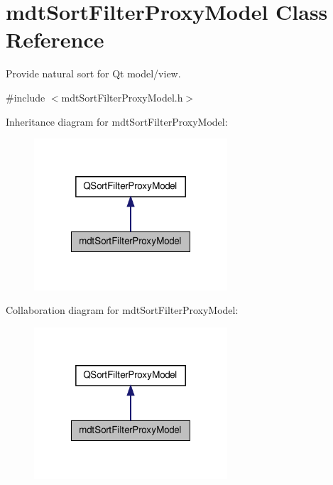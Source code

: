 \hypertarget{classmdt_sort_filter_proxy_model}{\section{mdt\-Sort\-Filter\-Proxy\-Model Class Reference}
\label{classmdt_sort_filter_proxy_model}
}


Provide natural sort for Qt model/view.  




{\ttfamily \#include $<$mdt\-Sort\-Filter\-Proxy\-Model.\-h$>$}



Inheritance diagram for mdt\-Sort\-Filter\-Proxy\-Model\-:\nopagebreak
\begin{figure}[H]
\begin{center}
\leavevmode
\includegraphics[width=204pt]{classmdt_sort_filter_proxy_model__inherit__graph}
\end{center}
\end{figure}


Collaboration diagram for mdt\-Sort\-Filter\-Proxy\-Model\-:\nopagebreak
\begin{figure}[H]
\begin{center}
\leavevmode
\includegraphics[width=204pt]{classmdt_sort_filter_proxy_model__coll__graph}
\end{center}
\end{figure}
